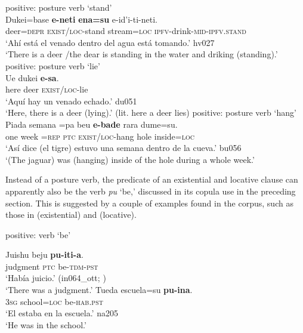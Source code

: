 \documentclass[output=paper]{langsci/langscibook}
\begin{document}
\begin{exe}
\ex\label{ex:tacana-posture-stand}  positive: posture verb `stand'\\
\gll {}Dukei=base \textbf{e-neti}
\textbf{ena=su} e-id'i-ti-neti.\\
    deer=\textsc{depr}  \textsc{exist/loc}-stand  stream=\textsc{loc}
    \textsc{ipfv}-drink-\textsc{mid-ipfv.stand}\\
\glt `Ahí está el venado dentro del agua está tomando.' hv027\\
`There is a deer \slash  the dear is standing in the water and driking (standing).'
\ex\label{ex:tacana-posture-lie}  positive: posture verb `lie'\\
\gll
    Ue dukei \textbf{e-sa}.\\
    here  deer  \textsc{exist/loc}-lie\\
\glt `Aquí hay un venado echado.' du051\\
`Here, there is a deer (lying).' (lit. here a deer lies)
\ex\label{ex:tacana-posture-hang}  positive: posture verb `hang'\\
\gll
 {\ob}Piada semana{\cb} =pa beu \textbf{e-bade}
 rara dume=su{\cb}.\\
 one  week  =\textsc{rep}  \textsc{ptc}  \textsc{exist/loc}-hang  hole
 inside\textsc{=loc}\\
\glt `Así dice (el tigre) estuvo una semana dentro de la cueva.' bu056\\
`(The jaguar) was (hanging) inside of the hole during a whole week.'
\end{exe}

Instead of a posture verb, the predicate of an existential and locative
clause can apparently also be the verb \textit{pu} `be,' discussed in its
copula use in the preceding section. This is suggested by a couple of
examples found in the corpus, such as those in
 (existential) and  (locative). 

\begin{exe}\ex
\label{ex:tacana-be-judgement-school}  positive: verb `be' 
\begin{xlist}
\ex\label{ex:tacana-be-judgement}
\gll {}Juishu  beju \textbf{pu-iti-a}.\\
    judgment  \textsc{ptc}  be-\textsc{tdm-pst}\\
\glt `Había juicio.' (in064\_ott; \citealt[62]{Ottaviano1980})\\
`There was a judgment.'
\ex\label{ex:tacana-be-school}
\gll  {}Tueda escuela=su \textbf{pu-ina}.\\
    \textsc{3sg}  school=\textsc{loc}  be-\textsc{hab.pst}\\
\glt `El estaba en la escuela.' na205\\
`He was in the school.'
\end{xlist}\end{exe}
\end{document}
